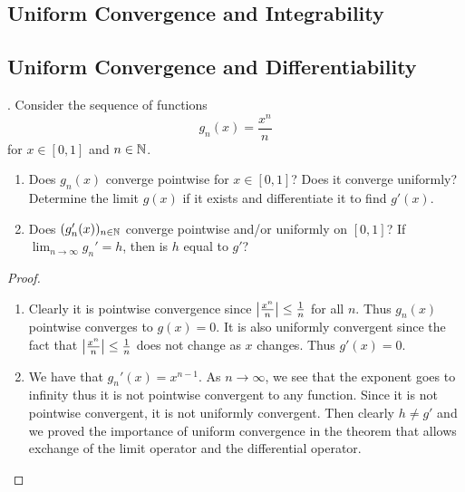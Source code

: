 \documentclass[a4paper]{article}
\begin{document}
\subsection{Uniform Convergence and Integrability}

\subsection{Uniform Convergence and Differentiability}
\begin{qtn}{}{}
\thetcbcounter.\;\; Consider the sequence of functions $$g_n(x)=\frac{x^n}{n}$$ for $x\in[0,1]$ and $n\in\mathbb{N}$. 
\begin{enumerate}[label=\alph*)]
\item Does $g_n(x)$ converge pointwise for $x\in[0,1]$? Does it converge uniformly? Determine the limit $g(x)$ if it exists and differentiate it to find $g'(x)$. 
\item Does $(g_n'(x))_{n\in\mathbb{N}}$ converge pointwise and/or uniformly on $[0,1]$? If $\lim_{n\to\infty}g_n'=h$, then is $h$ equal to $g'$?
\end{enumerate}\tcbline
\begin{proof}~\\
\begin{enumerate}[label=\alph*)]
\item Clearly it is pointwise convergence since $\abs{\frac{x^n}{n}}\leq\frac{1}{n}$ for all $n$. Thus $g_n(x)$ pointwise converges to $g(x)=0$. It is also uniformly convergent since the fact that $\abs{\frac{x^n}{n}}\leq\frac{1}{n}$ does not change as $x$ changes. Thus $g'(x)=0$. 
\item We have that $g_n'(x)=x^{n-1}$. As $n\to\infty$, we see that the exponent goes to infinity thus it is not pointwise convergent to any function. Since it is not pointwise convergent, it is not uniformly convergent. Then clearly $h\neq g'$ and we proved the importance of uniform convergence in the theorem that allows exchange of the limit operator and the differential operator. 
\end{enumerate}
\end{proof}
\end{qtn}
\end{document}
